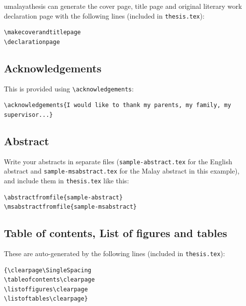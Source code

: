 \documentclass[a4paper,12pt]{scrartcl}
\begin{document}
\textsf{umalayathesis} can generate the cover page, title page and original literary work declaration page with the following lines (included in \texttt{thesis.tex}):

\medskip

\begin{lstlisting}[moretexcs={makecoverandtitlepage,copyrightpage,declarationpage}]
\makecoverandtitlepage
\declarationpage
\end{lstlisting}

\subsection{Acknowledgements}\label{sec:acknowledge}
This is provided using \lstinline|\acknowledgements|:

\medskip

\begin{lstlisting}
\acknowledgements{I would like to thank my parents, my family, my supervisor...}
\end{lstlisting}

\subsection{Abstract}\label{sec:abstract}
Write your abstracts in separate files (\texttt{sample-abstract.tex} for the English abstract and \texttt{sample-msabstract.tex} for the Malay abstract in this example), and include them in \texttt{thesis.tex} like this:

\begin{lstlisting}[moretexcs={abstractfromfile}]
\abstractfromfile{sample-abstract}
\msabstractfromfile{sample-msabstract}
\end{lstlisting}

\subsection{Table of contents, List of figures and tables}\label{sec:toc}

These are auto-generated by the following lines (included in \texttt{thesis.tex}):

\begin{lstlisting}[moretexcs={SingleSpacing,tableofcontents,listoftables,listoffigures}]
{\clearpage\SingleSpacing
\tableofcontents\clearpage
\listoffigures\clearpage
\listoftables\clearpage}
\end{lstlisting}
\end{document}
